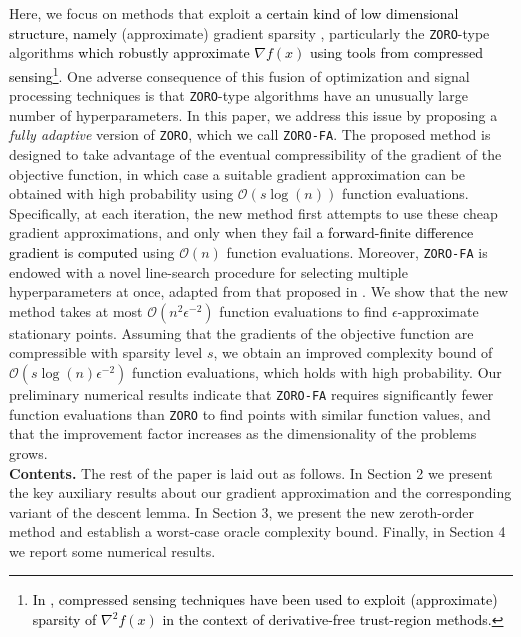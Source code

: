 Here, we focus on methods that exploit \textcolor{black}{a certain kind of low dimensional structure, namely} (approximate) gradient sparsity \cite{wang2018stochastic,balasubramanian2018zeroth,cai2021zeroth,cai2022one,cai2022zeroth,qiu2024gradient}, particularly the {\tt ZORO}-type algorithms \cite{cai2021zeroth,cai2022zeroth} \textcolor{black}{which robustly approximate $\nabla f(x)$ using tools from compressed sensing}\footnote{\textcolor{black}{In \cite{Bandeira}, compressed sensing techniques have been used to exploit (approximate) sparsity of $\nabla^{2}f(x)$ in the context of derivative-free trust-region methods.}}. One adverse consequence of this fusion of optimization and signal processing techniques is that {\tt ZORO}-type algorithms have an unusually large number of hyperparameters. In this paper, we address this issue by proposing a {\em fully adaptive} version of {\tt ZORO}, which we call {\tt ZORO-FA}. The proposed method is designed to take advantage of the eventual compressibility of the gradient of the objective function, in which case a suitable gradient approximation can be obtained with high probability using $\mathcal{O}\left(s\log(n)\right)$ function evaluations. Specifically, at each iteration, the new method first attempts to use these cheap gradient approximations, and only when they fail \textcolor{black}{a forward-finite difference gradient is computed} using $\mathcal{O}\left(n\right)$ function evaluations. Moreover, {\tt ZORO-FA} is endowed with a novel line-search procedure for selecting multiple hyperparameters at once, adapted from that proposed in \cite{grapiglia2024quadratic}. We show that the new method takes at most $\mathcal{O}\left(n^{2}\epsilon^{-2}\right)$ function evaluations to find $\epsilon$-approximate stationary points. Assuming that the gradients of the objective function are compressible with sparsity level $s$, we obtain an improved complexity bound of $\mathcal{O}\left(s\log\left(n\right)\epsilon^{-2}\right)$ function evaluations, which holds with high probability. Our preliminary numerical results indicate that {\tt ZORO-FA} requires significantly fewer function evaluations than {\tt ZORO} to find points with similar function values, and that the improvement factor increases as the dimensionality of the problems grows.\\

\noindent\textbf{Contents.} The rest of the paper is laid out as follows. In Section 2 we present the key auxiliary results about our gradient approximation and the corresponding variant of the descent lemma. In Section 3, we present the new zeroth-order method and establish a worst-case oracle complexity bound. Finally, in Section 4 we report some numerical results.
 
